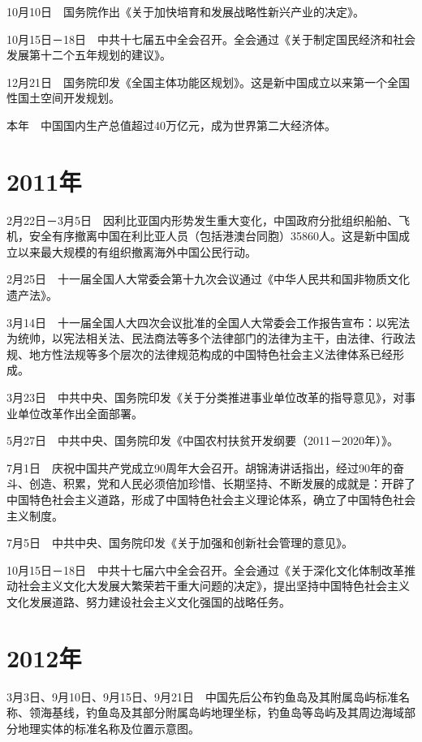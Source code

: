 \documentclass[10pt,a4paper,twocolumn]{book}
\begin{document}
10月10日　国务院作出《关于加快培育和发展战略性新兴产业的决定》。

10月15日－18日　中共十七届五中全会召开。全会通过《关于制定国民经济和社会发展第十二个五年规划的建议》。

12月21日　国务院印发《全国主体功能区规划》。这是新中国成立以来第一个全国性国土空间开发规划。

本年　中国国内生产总值超过40万亿元，成为世界第二大经济体。

\section{2011年}

2月22日－3月5日　因利比亚国内形势发生重大变化，中国政府分批组织船舶、飞机，安全有序撤离中国在利比亚人员（包括港澳台同胞）35860人。这是新中国成立以来最大规模的有组织撤离海外中国公民行动。

2月25日　十一届全国人大常委会第十九次会议通过《中华人民共和国非物质文化遗产法》。

3月14日　十一届全国人大四次会议批准的全国人大常委会工作报告宣布：以宪法为统帅，以宪法相关法、民法商法等多个法律部门的法律为主干，由法律、行政法规、地方性法规等多个层次的法律规范构成的中国特色社会主义法律体系已经形成。

3月23日　中共中央、国务院印发《关于分类推进事业单位改革的指导意见》，对事业单位改革作出全面部署。

5月27日　中共中央、国务院印发《中国农村扶贫开发纲要（2011－2020年）》。

7月1日　庆祝中国共产党成立90周年大会召开。胡锦涛讲话指出，经过90年的奋斗、创造、积累，党和人民必须倍加珍惜、长期坚持、不断发展的成就是：开辟了中国特色社会主义道路，形成了中国特色社会主义理论体系，确立了中国特色社会主义制度。

7月5日　中共中央、国务院印发《关于加强和创新社会管理的意见》。

10月15日－18日　中共十七届六中全会召开。全会通过《关于深化文化体制改革推动社会主义文化大发展大繁荣若干重大问题的决定》，提出坚持中国特色社会主义文化发展道路、努力建设社会主义文化强国的战略任务。

\section{2012年}

3月3日、9月10日、9月15日、9月21日　中国先后公布钓鱼岛及其附属岛屿标准名称、领海基线，钓鱼岛及其部分附属岛屿地理坐标，钓鱼岛等岛屿及其周边海域部分地理实体的标准名称及位置示意图。
\end{document}
